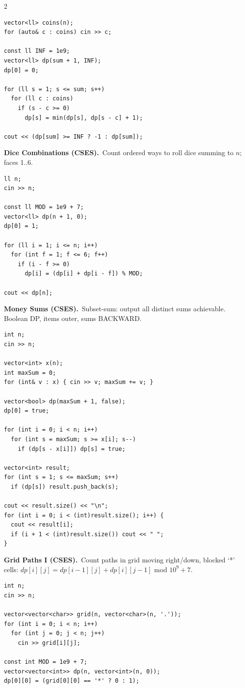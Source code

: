 \documentclass[10pt,letterpaper]{extarticle}
\newcommand{\prob}[2]{\par\addvspace{10pt}\noindent\label{prob:#1}\textbf{\normalsize #1.}\ {\small #2}\par\nopagebreak}
\begin{document}
\begin{multicols*}{2}
\begin{lstlisting}[style=cppt]
vector<ll> coins(n);
for (auto& c : coins) cin >> c;

const ll INF = 1e9;
vector<ll> dp(sum + 1, INF);
dp[0] = 0;

for (ll s = 1; s <= sum; s++)
  for (ll c : coins)
    if (s - c >= 0)
      dp[s] = min(dp[s], dp[s - c] + 1);

cout << (dp[sum] >= INF ? -1 : dp[sum]);
\end{lstlisting}

\prob{Dice Combinations (CSES)}{Count ordered ways to roll dice summing to $n$; faces 1..6.}
\begin{lstlisting}[style=cppt]
ll n;
cin >> n;

const ll MOD = 1e9 + 7;
vector<ll> dp(n + 1, 0);
dp[0] = 1;

for (ll i = 1; i <= n; i++)
  for (int f = 1; f <= 6; f++)
    if (i - f >= 0)
      dp[i] = (dp[i] + dp[i - f]) % MOD;

cout << dp[n];
\end{lstlisting}

\prob{Money Sums (CSES)}{Subset-sum: output all distinct sums achievable. Boolean DP, items outer, sums BACKWARD.}
\begin{lstlisting}[style=cppt]
int n;
cin >> n;

vector<int> x(n);
int maxSum = 0;
for (int& v : x) { cin >> v; maxSum += v; }

vector<bool> dp(maxSum + 1, false);
dp[0] = true;

for (int i = 0; i < n; i++)
  for (int s = maxSum; s >= x[i]; s--)
    if (dp[s - x[i]]) dp[s] = true;

vector<int> result;
for (int s = 1; s <= maxSum; s++)
  if (dp[s]) result.push_back(s);

cout << result.size() << "\n";
for (int i = 0; i < (int)result.size(); i++) {
  cout << result[i];
  if (i + 1 < (int)result.size()) cout << " ";
}
\end{lstlisting}

\prob{Grid Paths I (CSES)}{Count paths in grid moving right/down, blocked `*' cells: $dp[i][j]=dp[i-1][j]+dp[i][j-1]$ mod $10^9+7$.}
\begin{lstlisting}[style=cppt]
int n;
cin >> n;

vector<vector<char>> grid(n, vector<char>(n, '.'));
for (int i = 0; i < n; i++)
  for (int j = 0; j < n; j++)
    cin >> grid[i][j];

const int MOD = 1e9 + 7;
vector<vector<int>> dp(n, vector<int>(n, 0));
dp[0][0] = (grid[0][0] == '*' ? 0 : 1);


\end{lstlisting}
\end{multicols*}
\end{document}
